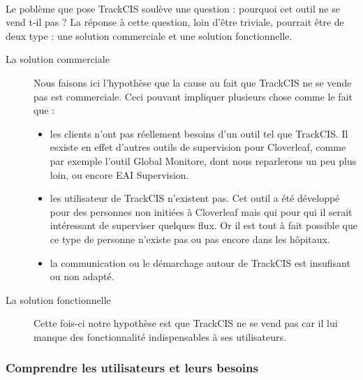 		\paragraph{}%
		Le poblème que pose TrackCIS soulève une question : pourquoi cet outil ne se
		vend t-il pas ? La réponse à cette question, loin d'être triviale, pourrait
		être de deux type : une solution commerciale et une solution fonctionnelle.
		\begin{description}
			\item[La solution commerciale] Nous faisons ici l'hypothèse que la cause au
			fait que TrackCIS ne se vende pas est commerciale. Ceci pouvant impliquer
			plusieurs chose comme le fait que :
			\begin{itemize}
			  \item les clients n'ont pas réellement besoins d'un outil tel que TrackCIS.
			  Il esxiste en effet d'autres outils de supervision pour Cloverleaf, comme
			  par exemple l'outil Global Monitore, dont nous reparlerons un peu plus
			  loin, ou encore EAI Supervision.
			  \item les utilisateur de TrackCIS n'existent pas. Cet outil a été développé
			  pour des personnes non initiées à Cloverleaf mais qui pour qui il serait
			  intéressant de superviser quelques flux.
			  Or il est tout à fait possible que ce type de personne n'existe pas ou pas
			  encore dans les hôpitaux.
			  \item la communication ou le démarchage autour de TrackCIS est insufisant
			  ou non adapté.
			\end{itemize}
			\item[La solution fonctionnelle] Cette fois-ci notre hypothèse est que
			TrackCIS ne se vend pas car il lui manque des fonctionnalité indispensables à
			ses utilisateurs.
		\end{description}
		
		\subsubsection{Comprendre les utilisateurs et leurs besoins}
			\paragraph{}%
			
			\paragraph{}%
			
